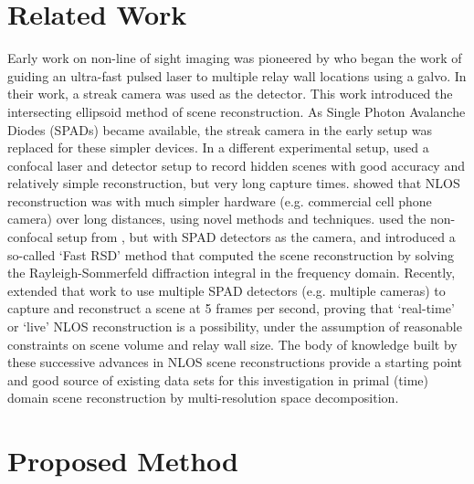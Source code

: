 \documentclass[conference]{IEEEtran}
\begin{document}
\section{Related Work}
Early work on non-line of sight imaging was pioneered by \cite{velten2012} who began the work of guiding an ultra-fast pulsed laser to multiple relay wall locations using a galvo. In their work, a streak camera was used as the detector. This work introduced the intersecting ellipsoid method of scene reconstruction. As Single Photon Avalanche Diodes (SPADs) became available, the streak camera in the early setup was replaced for these simpler devices. In a different experimental setup, \cite{OToole2018} used a confocal laser and detector setup to record hidden scenes with good accuracy and relatively simple reconstruction, but very long capture times. \cite{wang17} showed that NLOS reconstruction was with much simpler hardware (e.g. commercial cell phone camera) over long distances, using novel methods and techniques. \cite{Liu2019} used the non-confocal setup from \cite{velten2012}, but with SPAD detectors as the camera, and introduced a so-called `Fast RSD' method that computed the scene reconstruction by solving the Rayleigh-Sommerfeld diffraction integral in the frequency domain. Recently, \cite{Nam2020} extended that work to use multiple SPAD detectors (e.g. multiple cameras) to capture and reconstruct a scene at 5 frames per second, proving that `real-time' or `live' NLOS reconstruction is a possibility, under the assumption of reasonable constraints on scene volume and relay wall size. The body of knowledge built by these successive advances in NLOS scene reconstructions provide a starting point and good source of existing data sets for this investigation in primal (time) domain scene reconstruction by multi-resolution space decomposition.

\section{Proposed Method}
\end{document}
